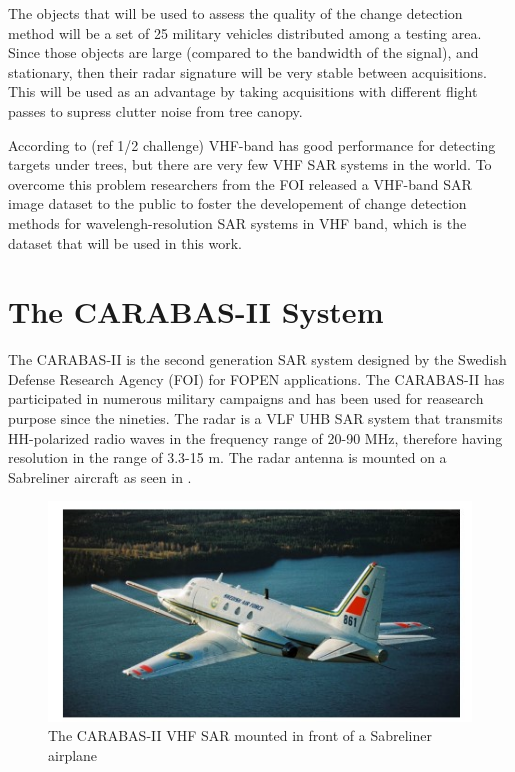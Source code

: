 The objects that will be used to assess the quality of the change detection method will be a set of 25 military vehicles distributed among a testing area.
Since those objects are large (compared to the bandwidth of the signal), and stationary, then their radar signature will be very stable between acquisitions.
This will be used as an advantage by taking acquisitions with different flight passes to supress clutter noise from tree canopy.

According to (ref 1/2 challenge) VHF-band has good performance for detecting targets under trees, but there are very few VHF SAR systems in the world.
To overcome this problem researchers from the FOI released a VHF-band SAR image dataset to the public to foster the developement of 
change detection methods for wavelengh-resolution SAR systems in VHF band, which is the dataset that will be used in this work.


\section{The CARABAS-II System}

The CARABAS-II is the second generation SAR system designed by the Swedish Defense Research Agency (FOI) for FOPEN applications.
The CARABAS-II has participated in numerous military campaigns and has been used for reasearch purpose since the nineties.
The radar is a VLF UHB SAR system that transmits HH-polarized radio waves in the frequency range of 
20-90 MHz, therefore having resolution in the range of 3.3-15 m. The radar antenna is mounted on a Sabreliner aircraft as seen in .

\begin{figure}[h]
    \centering
    \includegraphics{chapter6/sabreliner.jpg}
    \caption{The CARABAS-II VHF SAR mounted in front of a Sabreliner airplane}
    \label{fig:sabreliner}
\end{figure}

